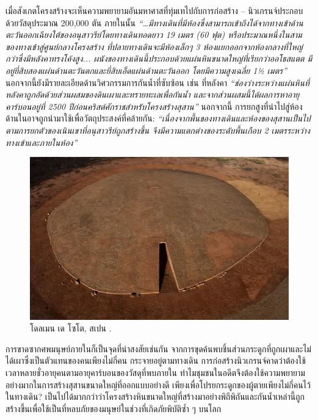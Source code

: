 \documentclass[10pt,twocolumn,letterpaper]{article}
\begin{document}
 เมื่อสังเกตโครงสร้างจะเห็นความพยายามอันมหาศาสที่ทุ่มเทไปกับการก่อสร้าง – นิวเกรนจ์ประกอบด้วยวัสดุประมาณ 200,000 ตัน ภายในนั้น \textit{“…มีทางเดินที่มีห้องซึ่งสามารถเข้าถึงได้จากทางเข้าด้านตะวันออกเฉียงใต้ของอนุสาวรีย์โดยทางเดินทอดยาว 19 เมตร (60 ฟุต) หรือประมาณหนึ่งในสามของทางเข้าสู่ศูนย์กลางโครงสร้าง ที่ปลายทางเดินจะมีห้องเล็กๆ 3 ห้องแยกออกจากห้องกลางที่ใหญ่กว่าซึ่งมีหลังคาทรงโค้งสูง...  ผนังของทางเดินนี้ประกอบด้วยแผ่นหินขนาดใหญ่ที่เรียกว่าออโธสแตต มีอยู่ยี่สิบสองแผ่นด้านตะวันตกและยี่สิบเอ็ดแผ่นด้านตะวันออก โดยมีความสูงเฉลี่ย 1½ เมตร”} \cite{70} นอกจากนี้ยังมีรายละเอียดด้านวิศวกรรมการกันน้ำที่ซับซ้อน เช่น ที่หลังคา \textit{“ช่องว่างระหว่างแผ่นหินที่หลังคาถูกอัดด้วยส่วนผสมของดินเผาและทรายทะเลเพื่อกันน้ำ และจากส่วนผสมนี้ได้ผลการหาอายุคาร์บอนอยู่ที่ 2500 ปีก่อนคริสต์ศักราชสำหรับโครงสร้างสุสาน”} \cite{71} นอกจากนี้ การยกสูงที่นำไปสู่ห้องด้านในอาจถูกนำมาใช้เพื่อวัตถุประสงค์ที่คล้ายกัน: \textit{“เนื่องจากพื้นของทางเดินและห้องของสุสานเป็นไปตามการยกตัวของเนินเขาที่อนุสาวรีย์ถูกสร้างขึ้น จึงมีความแตกต่างของระดับพื้นเกือบ 2 เมตรระหว่างทางเข้าและภายในห้อง”} \cite{71}

\begin{figure}[b]

\begin{center}
   \includegraphics[width=1\linewidth]{dolmen.jpg}
\end{center}
   \caption{โดลเมน เด โซโต, สเปน \cite{53}.}
\label{fig:9}
\label{fig:onecol}
\end{figure}

การขาดซากศพมนุษย์ภายในก็เป็นจุดที่น่าสงสัยเช่นกัน จากการขุดค้นพบชิ้นส่วนกระดูกที่ถูกเผาและไม่ได้เผาซึ่งเป็นตัวแทนของคนเพียงไม่กี่คน กระจายอยู่ตามทางเดิน การก่อสร้างนิวเกรนจ์คาดว่าต้องใช้เวลาหลายชั่วอายุคนตามอายุคาร์บอนของวัสดุที่พบภายใน ทำไมชุมชนในอดีตจึงต้องใช้ความพยายามอย่างมากในการสร้างสุสานขนาดใหญ่ที่ออกแบบอย่างดี เพียงเพื่อโปรยกระดูกของผู้ตายเพียงไม่กี่คนไว้ในทางเดิน? เป็นไปได้มากกว่าว่าโครงสร้างหินขนาดใหญ่ที่สร้างมาอย่างพิถีพิถันและกันน้ำเหล่านี้ถูกสร้างขึ้นเพื่อใช้เป็นที่หลบภัยของมนุษย์ในช่วงที่เกิดภัยพิบัติซ้ำ ๆ บนโลก
\end{document}
